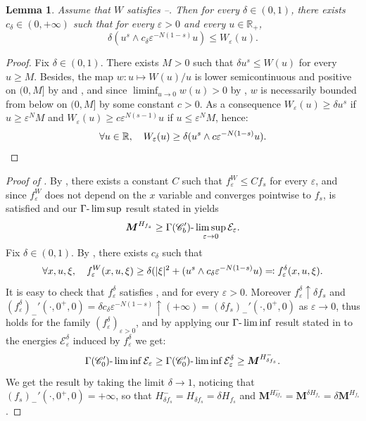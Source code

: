 \documentclass[10pt]{amsart}
\theoremstyle{plain}
\newtheorem{lemma}[theorem]{Lemma}
\theoremstyle{definition}
\newcommand{\R}{\mathbb{R}}
\newcommand{\Cspace}{\mathscr{C}}
\newcommand{\ener}{\mathcal{E}}
\newcommand{\mass}{\boldsymbol{M}}
\newcommand{\eps}{\varepsilon}
\DeclarePairedDelimiter{\abs}{\lvert}{\rvert}
\begin{document}
\begin{lemma}\label{lemmaW}
Assume that $W$ satisfies --. Then for every $\delta \in (0,1)$, there exists $c_\delta \in (0,+\infty)$ such that for every $\eps > 0$ and every $u \in \R_+$,
\begin{equation}
\delta ( u^s \wedge c_\delta \eps^{-N(1-s)} u) \leq W_\eps(u).
\end{equation}
\end{lemma}
\begin{proof}
Fix $\delta \in (0,1)$. There exists $M > 0$ such that $\delta u^s \leq W(u)$ for every $u \geq M$. Besides, the map $w : u \mapsto W(u)/u$ is lower semicontinuous and positive on $(0,M]$ by  and , and since $\liminf_{u\to 0} w(u) > 0$ by , $w$ is necessarily bounded from below on $(0,M]$ by some constant $c > 0$. As a consequence $W_\eps(u) \geq \delta u^s$ if $u\geq \eps^N M$ and $W_\eps(u) \geq c \eps^{N(s-1)}u$ if $u\leq \eps^N M$, hence:
\[\forall u\in \R, \quad W_\eps(u) \geq \delta ( u^s \wedge c \eps^{-N(1-s)} u).\qedhere\]
\end{proof}

\begin{proof}[Proof of ]
By , there exists a constant $C$ such that $f_\eps^W \leq C f_s$ for every $\eps$, and since $f_\eps^W$ does not depend on the $x$ variable and converges pointwise to $f_s$,  is satisfied and our $\Gamma\textup{-}\limsup$ result stated in  yields
\[\mass^{H_{f_s}} \geq \Gamma(\Cspace_b')\textup{-}\limsup_{\eps \to 0} \ener_\eps.\]
Fix $\delta \in (0,1)$. By , there exists $c_\delta$ such that
\[\forall x,u,\xi, \quad f_\eps^W(x,u,\xi) \geq \delta(\abs{\xi}^2 + (u^s \wedge c_\delta \eps^{-N(1-s)} u) \eqqcolon f_\eps^\delta(x,u,\xi).\]
It is easy to check that $f^\delta_\eps$ satisfies ,  and  for every $\eps > 0$. Moreover $f_\eps^\delta \uparrow \delta f_s$ and $(f_{\eps}^\delta)_-'(\cdot,0^+,0) = \delta c_\delta \eps^{-N(1-s)} \uparrow (+\infty) = (\delta f_s)_-'(\cdot,0^+,0)$ as $\eps \to 0$, thus  holds for the family $(f_\eps^\delta)_{\eps > 0}$, and by applying our $\Gamma\textup{-}\liminf$ result stated in  to the energies $\ener_\eps^\delta$ induced by $f_\eps^\delta$ we get:
\[\Gamma(\Cspace_0')\textup{-}\liminf \ener_\eps \geq \Gamma(\Cspace_0')\textup{-}\liminf \ener_\eps^\delta \geq \mass^{H_{\delta f_s}^-}.\]
We get the result by taking the limit $\delta \to 1$, noticing that $(f_s)_-'(\cdot,0^+,0) = +\infty$, so that $H_{\delta f_s}^- = H_{\delta f_s} = \delta H_{f_s}$ and $\mass^{H_{\delta f_s}^-} = \mass^{\delta H_{f_s}} = \delta \mass^{H_{f_s}}$.
\end{proof}
\end{document}
